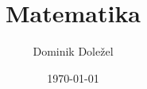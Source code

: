 \documentclass[11pt]{template/cauchy}
\title[Title for the Header]{Matematika}
\subtitle{}
\author{Dominik Doležel}
\affiliation{a kolektiv}
\date{\today}
\begin{document}


\frontmatter
\tableofcontents
\clearpage


\mainmatter

% 

\nocite{*}
\clearpage
{\small}

\backmatter

\end{document}
